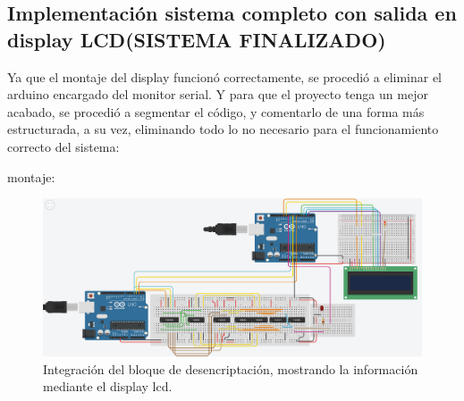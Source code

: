 \documentclass{article}
\begin{document}
\subsection{Implementación sistema completo con salida en display LCD(SISTEMA FINALIZADO)}\label{intento1}
Ya que el montaje del display funcionó correctamente, se procedió a eliminar el arduino encargado del monitor serial. Y para que el proyecto tenga un mejor acabado, se procedió a segmentar el código, y comentarlo de una forma más estructurada, a su vez, eliminando todo lo no necesario para el funcionamiento correcto del sistema:

montaje:
\begin{figure}[h]
\includegraphics[scale=0.5]{integracion arduinos lcd.png}
\centering
\caption{Integración del bloque de desencriptación, mostrando la información mediante el display lcd.}
\label{fig:lcd}
\end{figure}
\end{document}
